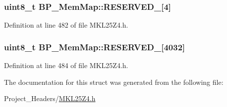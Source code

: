 \subsubsection[{\texorpdfstring{R\+E\+S\+E\+R\+V\+E\+D\+\_\+0}{RESERVED_0}}]{\setlength{\rightskip}{0pt plus 5cm}uint8\+\_\+t B\+P\+\_\+\+Mem\+Map\+::\+R\+E\+S\+E\+R\+V\+E\+D\+\_\mbox{[}4\mbox{]}}\hypertarget{struct_b_p___mem_map_aeec0c0802a6643ff1423787e429c4b77}{}\label{struct_b_p___mem_map_aeec0c0802a6643ff1423787e429c4b77}


Definition at line 482 of file M\+K\+L25\+Z4.\+h.

\subsubsection[{\texorpdfstring{R\+E\+S\+E\+R\+V\+E\+D\+\_\+1}{RESERVED_1}}]{\setlength{\rightskip}{0pt plus 5cm}uint8\+\_\+t B\+P\+\_\+\+Mem\+Map\+::\+R\+E\+S\+E\+R\+V\+E\+D\+\_\mbox{[}4032\mbox{]}}\hypertarget{struct_b_p___mem_map_a72d853a7f23eb2aa5e1c285f1f022449}{}\label{struct_b_p___mem_map_a72d853a7f23eb2aa5e1c285f1f022449}


Definition at line 484 of file M\+K\+L25\+Z4.\+h.



The documentation for this struct was generated from the following file\+:\begin{DoxyCompactItemize}
\item 
Project\+\_\+\+Headers/\hyperlink{_m_k_l25_z4_8h}{M\+K\+L25\+Z4.\+h}\end{DoxyCompactItemize}
